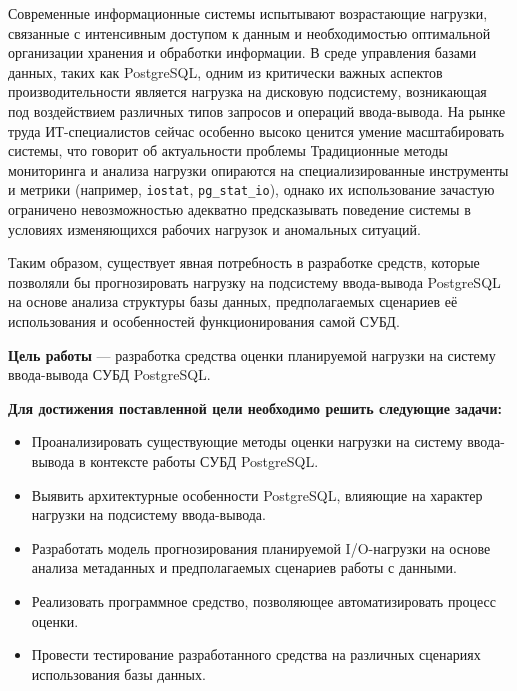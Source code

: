 Современные информационные системы испытывают возрастающие нагрузки, связанные с интенсивным доступом к данным 
и необходимостью оптимальной организации хранения и обработки информации. В среде управления базами данных, 
таких как PostgreSQL, одним из критически важных аспектов производительности является нагрузка на дисковую подсистему, 
возникающая под воздействием различных типов запросов и операций ввода-вывода. 
На рынке труда ИТ-специалистов сейчас особенно высоко ценится умение масштабировать системы, что говорит об актуальности проблемы \cite{Shukhman2022}
Традиционные методы мониторинга и анализа нагрузки опираются на специализированные инструменты и метрики (например, \texttt{iostat}, \texttt{pg\_stat\_io}), 
однако их использование зачастую ограничено невозможностью адекватно предсказывать поведение системы в условиях изменяющихся 
рабочих нагрузок и аномальных ситуаций.


Та\-ким об\-ра\-зом, су\-ще\-ству\-ет яв\-ная по\-треб\-ность в раз\-ра\-бот\-ке средств, ко\-то\-рые поз\-во\-ля\-ли 
бы про\-гно\-зи\-ро\-вать на\-груз\-ку на под\-си\-сте\-му вво\-да-вы\-во\-да Post\-gre\-SQL на ос\-но\-ве ана\-ли\-за 
струк\-ту\-ры ба\-зы дан\-ных, пред\-по\-ла\-га\-е\-мых сце\-на\-ри\-ев её ис\-поль\-зо\-ва\-ния и осо\-бен\-но\-стей 
функ\-ци\-о\-ни\-ро\-ва\-ния са\-мой \mbox{СУБД}.
\vspace{5mm}

\textbf{Цель работы} — разработка средства оценки планируемой нагрузки на систему ввода-вывода СУБД PostgreSQL.\

\vspace{5mm}

\textbf{Для достижения поставленной цели необходимо решить следующие задачи:}
\begin{itemize}[leftmargin=*,align=left]
    \item Про\-анализи\-ровать су\-ще\-ствую\-щие ме\-то\-ды оцен\-ки на\-груз\-ки на си\-сте\-му вво\-да-вы\-во\-да в кон\-тек\-сте ра\-бо\-ты \mbox{СУБД} PostgreSQL.\
    \item Вы\-я\-вить ар\-хи\-тек\-тур\-ные осо\-бен\-но\-сти Post\-gre\-SQL, вли\-яю\-щие на ха\-рак\-тер на\-груз\-ки на под\-си\-сте\-му вво\-да-вы\-во\-да.\
    \item Раз\-ра\-бо\-тать мо\-дель про\-гно\-зи\-ро\-ва\-ния пла\-ни\-ру\-е\-мой I/O-на\-груз\-ки на ос\-но\-ве ана\-ли\-за ме\-та\-дан\-ных и пред\-по\-ла\-га\-е\-мых сце\-на\-ри\-ев ра\-бо\-ты с дан\-ны\-ми.\
    \item Ре\-а\-ли\-зо\-вать про\-грамм\-ное сред\-ство, по\-зво\-ля\-ю\-щее ав\-то\-ма\-ти\-зи\-ро\-вать про\-цесс оцен\-ки.\
    \item Про\-вес\-ти тес\-ти\-ро\-ва\-ние раз\-ра\-бо\-тан\-но\-го сред\-ства на раз\-лич\-ных сце\-на\-ри\-ях ис\-поль\-зо\-ва\-ния ба\-зы дан\-ных.\
\end{itemize}


